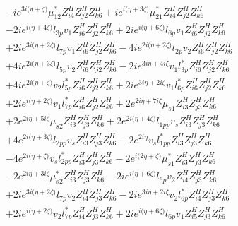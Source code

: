 \begin{align}
 &-i e^{3 i \Big(\eta +\zeta \Big)} \mu_{12}^* Z_{{i 4}}^{H} Z_{{j 2}}^{H} Z_{{k 6}}^{H} +i e^{i \Big(\eta +3 \zeta \Big)} \mu_{21}^* Z_{{i 4}}^{H} Z_{{j 2}}^{H} Z_{{k 6}}^{H} \nonumber \\ 
 &-2 i e^{i \Big(\eta +4 \zeta \Big)} l_{3p} v_1 Z_{{i 6}}^{H} Z_{{j 2}}^{H} Z_{{k 6}}^{H} +2 i e^{i \Big(\eta +6 \zeta \Big)} l_{6p} v_1 Z_{{i 6}}^{H} Z_{{j 2}}^{H} Z_{{k 6}}^{H} \nonumber \\ 
 &+2 i e^{3 i \Big(\eta +2 \zeta \Big)} l_{7p} v_1 Z_{{i 6}}^{H} Z_{{j 2}}^{H} Z_{{k 6}}^{H} -4 i e^{2 i \Big(\eta +2 \zeta \Big)} l_{2p} v_2 Z_{{i 6}}^{H} Z_{{j 2}}^{H} Z_{{k 6}}^{H} \nonumber \\ 
 &+4 i e^{2 i \Big(\eta +3 \zeta \Big)} l_{5p} v_2 Z_{{i 6}}^{H} Z_{{j 2}}^{H} Z_{{k 6}}^{H} -2 i e^{3 i \eta +4 i \zeta } v_1 l_{3p}^* Z_{{i 6}}^{H} Z_{{j 2}}^{H} Z_{{k 6}}^{H} \nonumber \\ 
 &+4 i e^{2 i \Big(\eta +\zeta \Big)} v_2 l_{5p}^* Z_{{i 6}}^{H} Z_{{j 2}}^{H} Z_{{k 6}}^{H} +2 i e^{3 i \eta +2 i \zeta } v_1 l_{6p}^* Z_{{i 6}}^{H} Z_{{j 2}}^{H} Z_{{k 6}}^{H} \nonumber \\ 
 &+2 i e^{i \Big(\eta +2 \zeta \Big)} v_1 l_{7p}^* Z_{{i 6}}^{H} Z_{{j 2}}^{H} Z_{{k 6}}^{H} +2 e^{2 i \eta +7 i \zeta } \mu_{s1} Z_{{i 3}}^{H} Z_{{j 3}}^{H} Z_{{k 6}}^{H} \nonumber \\ 
 &+2 e^{2 i \eta +5 i \zeta } \mu_{s2} Z_{{i 3}}^{H} Z_{{j 3}}^{H} Z_{{k 6}}^{H} +2 e^{2 i \Big(\eta +4 \zeta \Big)} l_{1pp} v_s Z_{{i 3}}^{H} Z_{{j 3}}^{H} Z_{{k 6}}^{H} \nonumber \\ 
 &+4 e^{2 i \Big(\eta +3 \zeta \Big)} l_{2pp} v_s Z_{{i 3}}^{H} Z_{{j 3}}^{H} Z_{{k 6}}^{H} -2 e^{2 i \eta } v_s l_{1pp}^* Z_{{i 3}}^{H} Z_{{j 3}}^{H} Z_{{k 6}}^{H} \nonumber \\ 
 &-4 e^{2 i \Big(\eta +\zeta \Big)} v_s l_{2pp}^* Z_{{i 3}}^{H} Z_{{j 3}}^{H} Z_{{k 6}}^{H} -2 e^{i \Big(2 \eta +\zeta \Big)} \mu_{s1}^* Z_{{i 3}}^{H} Z_{{j 3}}^{H} Z_{{k 6}}^{H} \nonumber \\ 
 &-2 e^{2 i \eta +3 i \zeta } \mu_{s2}^* Z_{{i 3}}^{H} Z_{{j 3}}^{H} Z_{{k 6}}^{H} -2 i e^{i \Big(\eta +6 \zeta \Big)} l_{6p} v_2 Z_{{i 4}}^{H} Z_{{j 3}}^{H} Z_{{k 6}}^{H} \nonumber \\ 
 &+2 i e^{3 i \Big(\eta +2 \zeta \Big)} l_{7p} v_2 Z_{{i 4}}^{H} Z_{{j 3}}^{H} Z_{{k 6}}^{H} -2 i e^{3 i \eta +2 i \zeta } v_2 l_{6p}^* Z_{{i 4}}^{H} Z_{{j 3}}^{H} Z_{{k 6}}^{H} \nonumber \\ 
 &+2 i e^{i \Big(\eta +2 \zeta \Big)} v_2 l_{7p}^* Z_{{i 4}}^{H} Z_{{j 3}}^{H} Z_{{k 6}}^{H} +2 i e^{i \Big(\eta +6 \zeta \Big)} l_{6p} v_1 Z_{{i 5}}^{H} Z_{{j 3}}^{H} Z_{{k 6}}^{H} \nonumber \\ 

\end{align}
